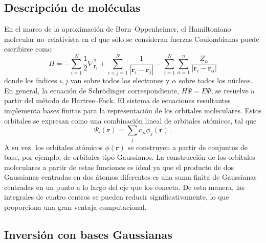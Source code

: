 \subsection{Descripción de moléculas}
\label{sec:moleculas}

En el marco de la aproximación de Born--Oppenheimer, el Hamiltoniano 
molecular no--relativista en el que sólo se consideran fuerzas 
Coulombianas puede escribirse como
\begin{equation}
H=-\sum_{i=1}^N \frac{1}{2} \nabla^2_{\mathbf{r}_i} 
  +\sum_{i<j=1}^N \frac{1}{\left|\mathbf{r}_i-\mathbf{r}_j\right|} 
  -\sum_{i=1}^N \sum_{\alpha=1}^n \frac{Z_{\alpha}}{
    \left|\mathbf{r}_i-\mathbf{r}_{\alpha}\right|} 
\label{eq:BOhamiltonian}
\end{equation}
donde los índices $i,j$ van sobre todos los electrones y $\alpha$ 
sobre todos los núcleos. En general, la ecuación de Schr\"odinger 
correspondiente, $H\Psi=E\Psi$, se resuelve a partir del método de 
Hartree--Fock. El sistema de ecuaciones resultantes implementa bases 
finitas para la representación de los orbitales moleculares. Estos 
orbitales se expresan como una combinación lineal de orbitales atómicos, 
tal que
\begin{equation}
\Psi_i(\mathbf{r})=\sum_j c_{ji} \phi_j(\mathbf{r})\,.
\end{equation}
A su vez, los orbitales atómicos $\phi(\mathbf{r})$ se construyen a 
partir de conjuntos de base, por ejemplo, de orbitales tipo Gaussianos. 
La construcción de los orbitales moleculares a partir de estas funciones 
es ideal ya que el producto de dos Gaussianas centradas en dos átomos 
diferentes es una suma finita de Gaussianas centradas en un punto a lo 
largo del eje que los conecta. De esta manera, las integrales de cuatro 
centros se pueden reducir significativamente, lo que proporciona 
una gran ventaja computacional.

\subsection{Inversión con bases Gaussianas}
\label{sec:invmol}

